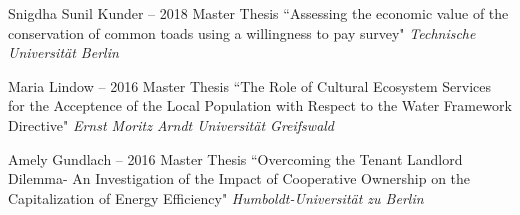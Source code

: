 \documentclass[paper=a4,fontsize=11pt]{scrartcl} %
\newcommand{\ThesisEntry}[5]{
		\noindent #1 -- #2 #3 ``#4" \textit{#5}}
\begin{document}
\begin{etaremune}
\item \ThesisEntry{Snigdha Sunil Kunder}{2018}{Master Thesis}{Assessing the economic value of the conservation of common toads using a willingness to pay survey}{Technische Universität Berlin}

\item \ThesisEntry{Maria Lindow}{2016}{Master Thesis}{The Role of Cultural Ecosystem Services for the Acceptence of the Local Population with Respect to the Water Framework Directive}{Ernst Moritz Arndt Universität Greifswald}

\item \ThesisEntry{Amely Gundlach}{2016}{Master Thesis}{Overcoming the Tenant Landlord Dilemma-
An Investigation of the Impact of Cooperative Ownership on the Capitalization of Energy Efficiency}{Humboldt-Universität zu Berlin}


\end{etaremune}
\end{document}
